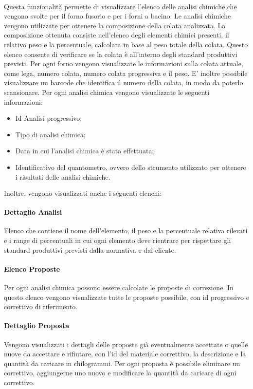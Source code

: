   \paragraph{}
  Questa funzionalità permette di visualizzare l’elenco delle analisi chimiche che vengono svolte per 
  il forno fusorio e per i forni a bacino. Le analisi chimiche vengono utilizzate per ottenere la 
  composizione della colata analizzata. La composizione ottenuta consiste nell’elenco degli elementi 
  chimici presenti, il relativo peso e la percentuale, calcolata in base al peso totale della colata. 
  Questo elenco consente di verificare se la colata è all’interno degli standard produttivi previsti. 
  Per ogni forno vengono visualizzate le informazioni sulla colata attuale, come lega, numero colata, 
  numero colata progressiva e il peso. E’ inoltre possibile visualizzare un barcode che identifica il 
  numero della colata, in modo da poterlo scansionare. Per ogni analisi chimica vengono 
  visualizzate le seguenti informazioni: 
  \begin{itemize}
    \item Id Analisi progressivo;
    \item Tipo di analisi chimica;
    \item Data in cui l'analisi chimica è stata effettuata;
    \item Identificativo del quantometro, ovvero dello strumento utilizzato per ottenere i risultati 
    delle analisi chimiche.
  \end{itemize}   
  Inoltre, vengono visualizzati anche i seguenti elenchi:
  \paragraph{Dettaglio Analisi}
  Elenco che contiene il nome dell’elemento, il peso e la percentuale relativa rilevati e i range di 
  percentuali in cui ogni elemento deve rientrare per rispettare gli standard produttivi previsti dalla 
  normativa e dal cliente. 
  \paragraph{Elenco Proposte}
  Per ogni analisi chimica possono essere calcolate le proposte di correzione. In questo elenco vengono 
  visualizzate tutte le proposte possibile, con id progressivo e correttivo di riferimento.
  \paragraph{Dettaglio Proposta}
  Vengono visualizzati i dettagli delle proposte già eventualmente accettate o quelle nuove da accettare 
  e rifiutare, con l’id del materiale correttivo, la descrizione e la quantità da caricare in chilogrammi. 
  Per ogni proposta è possibile eliminare un correttivo, aggiungerne uno nuovo e modificare la quantità 
  da caricare di ogni correttivo.


